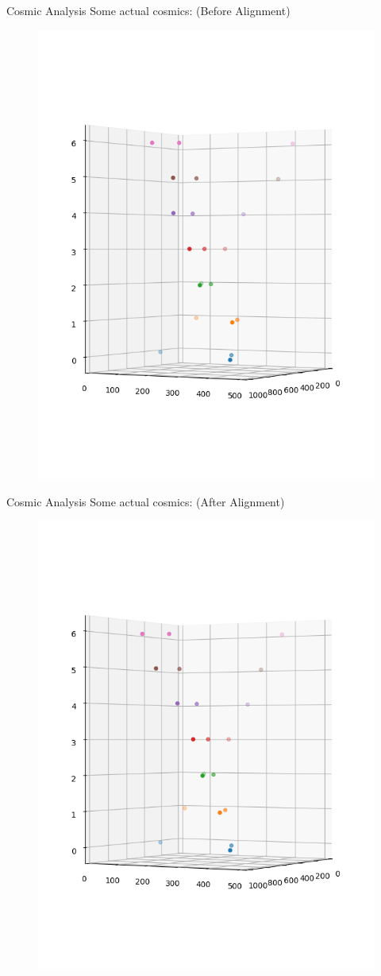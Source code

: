 \documentclass{beamer}
\begin{document}
\begin{frame}{Cosmic Analysis}
    Some actual cosmics: (Before Alignment)
    \begin{figure}[H]
	\centering
	\includegraphics[trim=0 50 0 100,clip,width=.7\textwidth]{Before.png}
    \end{figure}
\end{frame}
\begin{frame}{Cosmic Analysis}
    Some actual cosmics: (After Alignment)
    \begin{figure}[H]
	\centering
	\includegraphics[trim=0 50 0 100,clip,width=.7\textwidth]{After.png}
    \end{figure}
\end{frame}
\end{document}
